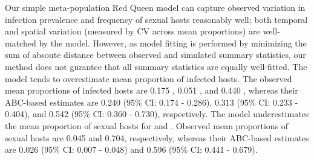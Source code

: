 \documentclass{article}\usepackage[]{graphicx}\usepackage[]{color}
\begin{document}
Our simple meta-population Red Queen model can capture observed variation in infection prevalence and frequency of sexual hosts reasonably well;
both temporal and spatial variation (measured by CV across mean proportions) are well-matched by the model. 
However, as model fitting is performed by minimizing the sum of absoute distance between observed and simulated summary statistics, our method does not gurantee that all summary statistics are equally well-fitted.
The model tends to overestimate mean proportion of infected hosts.
The observed mean proportions of infected hosts are 0.175 \citep{dagan2013clonal}, 0.051 \citep{mckone2016fine}, and 0.440 \citep{vergara2014infection}, 
whereas their ABC-based estimates are 0.240 (95\% CI: 0.174 - 0.286), 0.313 (95\% CI: 0.233 - 0.404), and 0.542 (95\% CI: 0.360 - 0.730), respectively.
The model underestimates the mean proportion of sexual hosts for \cite{dagan2013clonal} and \cite{vergara2014infection}.
Observed mean proportions of sexual hosts are 0.045 and 0.704, respectively, whereas their ABC-based estimates are 0.026 (95\% CI: 0.007 - 0.048) and 0.596 (95\% CI: 0.441 - 0.679).
\end{document}
